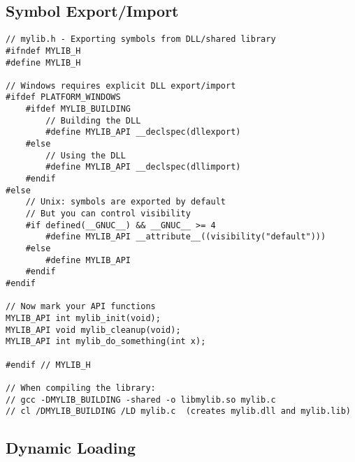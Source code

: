\subsection{Symbol Export/Import}

\begin{lstlisting}
// mylib.h - Exporting symbols from DLL/shared library
#ifndef MYLIB_H
#define MYLIB_H

// Windows requires explicit DLL export/import
#ifdef PLATFORM_WINDOWS
    #ifdef MYLIB_BUILDING
        // Building the DLL
        #define MYLIB_API __declspec(dllexport)
    #else
        // Using the DLL
        #define MYLIB_API __declspec(dllimport)
    #endif
#else
    // Unix: symbols are exported by default
    // But you can control visibility
    #if defined(__GNUC__) && __GNUC__ >= 4
        #define MYLIB_API __attribute__((visibility("default")))
    #else
        #define MYLIB_API
    #endif
#endif

// Now mark your API functions
MYLIB_API int mylib_init(void);
MYLIB_API void mylib_cleanup(void);
MYLIB_API int mylib_do_something(int x);

#endif // MYLIB_H

// When compiling the library:
// gcc -DMYLIB_BUILDING -shared -o libmylib.so mylib.c
// cl /DMYLIB_BUILDING /LD mylib.c  (creates mylib.dll and mylib.lib)
\end{lstlisting}

\subsection{Dynamic Loading}


